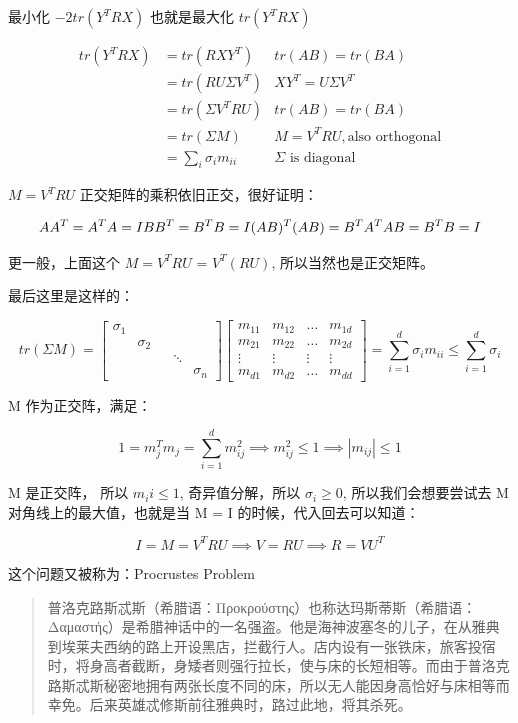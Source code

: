 \documentclass[
]{book}
\begin{document}
最小化 \(-2tr(Y^T R X)\) 也就是最大化 \(tr(Y^T R X)\)

\[
\begin{aligned}
tr(Y^TRX)  {}
&= tr(RXY^T) & tr(AB) = tr(BA) \\
&= tr(R U \Sigma V^T) & XY^T = U \Sigma V^T \\ 
&= tr(\Sigma V^T R U ) & tr(AB) = tr(BA) \\ 
&= tr(\Sigma M) & M = V^TRU, \text{also orthogonal} \\
&= \sum_i \sigma_im_{ii} & \Sigma \text{ is diagonal}
\end{aligned}  
\]

\(M = V^TRU\) 正交矩阵的乘积依旧正交，很好证明：

\[
AA^T = A^TA =  I \\
BB^T = B^TB = I \\
(AB)^T(AB) = B^TA^TAB = B^TB = I
\]

更一般，上面这个 \(M = V^TRU\) = \(V^T (RU)\), 所以当然也是正交矩阵。

最后这里是这样的：

\[
tr(\Sigma M) = \begin{bmatrix} \sigma_1 &  &  & &  \\  & \sigma_2 &  &  \\  &  &  & \ddots &  \\ &   &  &  & \sigma_n\end{bmatrix} \begin{bmatrix} m_{11} & m_{12} &  \dots  & m_{1d} \\ m_{21} &  m_{22} & \dots  & m_{2d}  \\ \vdots & \vdots & \vdots  & \vdots \\ m_{d1} &  m_{d2} & \dots  & m_{dd}  \end{bmatrix}  = \sum_{i=1}^d\sigma_im_{ii} \le \sum_{i=1}^d \sigma_i
\]

M 作为正交阵，满足：

\[
1 = m_j^Tm_j = \sum_{i=1}^d m_{ij}^2 \implies m_{ij}^2 \le 1 \implies |m_{ij}| \le 1
\]

M 是正交阵， 所以 \(m_ii \le 1\), 奇异值分解，所以 \(\sigma_i \ge 0\), 所以我们会想要尝试去 M 对角线上的最大值，也就是当 M = I 的时候，代入回去可以知道：

\[
I = M = V^TRU \implies V = RU \implies R = VU^T
\]

这个问题又被称为：Procrustes Problem

\begin{quote}
普洛克路斯忒斯（希腊语：Προκρούστης）也称达玛斯蒂斯（希腊语：Δαμαστής）是希腊神话中的一名强盗。他是海神波塞冬的儿子，在从雅典到埃莱夫西纳的路上开设黑店，拦截行人。店内设有一张铁床，旅客投宿时，将身高者截断，身矮者则强行拉长，使与床的长短相等。而由于普洛克路斯忒斯秘密地拥有两张长度不同的床，所以无人能因身高恰好与床相等而幸免。后来英雄忒修斯前往雅典时，路过此地，将其杀死。
\end{quote}
\end{document}
